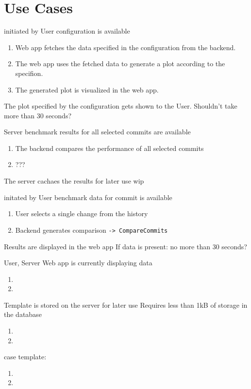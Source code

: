 \section{Use Cases}

{initiated by User}
{configuration is available}
{\begin{enumerate}
    \item Web app fetches the data specified in the configuration from the backend.
    \item The web app uses the fetched data to generate a plot according to the specifion.
    \item The generated plot is visualized in the web app.
\end{enumerate}}
{The plot specified by the configuration gets shown to the User.}
{Shouldn't take more than 30 seconds?}

\bigskip

{Server}
{benchmark results for all selected commits are available}
{\begin{enumerate}
    \item The backend compares the performance of all selected commits  
    \item ???
\end{enumerate}}
{The server cachaes the results for later use}
{wip}

\bigskip

{initated by User}
{benchmark data for commit is available}
{\begin{enumerate}
    \item User selects a single change from the history
    \item Backend generates comparison \texttt{-> CompareCommits}
\end{enumerate}}
{Results are displayed in the web app}
{If data is present: no more than 30 seconds?}

\bigskip

{User, Server}
{Web app is currently displaying data}
{\begin{enumerate}
    \item
    \item
\end{enumerate}} 
{Template is stored on the server for later use}
{Requires less than 1kB of storage in the database}

\bigskip

\case{}
{}
{}
{\begin{enumerate}
    \item
    \item
\end{enumerate}} 
{}
{}

\bigskip

case template:
\case{}
{}
{}
{\begin{enumerate}
    \item
    \item
\end{enumerate}} 
{}
{}

\bigskip